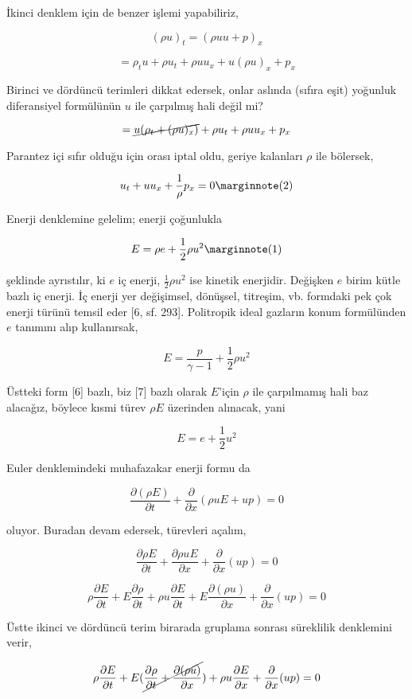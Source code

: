 \documentclass[12pt,fleqn]{article}\usepackage{../../common}
\begin{document}
İkinci denklem için de benzer işlemi yapabiliriz,

$$
(\rho u)_t = (\rho uu + p)_x
$$

$$
= \rho_t u + \rho u_t + \rho u u_x + u (\rho u)_x + p_x
$$

Birinci ve dördüncü terimleri dikkat edersek, onlar aslında (sıfıra eşit)
yoğunluk diferansiyel formülünün $u$ ile çarpılmış hali değil mi?

$$
= \cancel{u (\rho_t + (\rho u)_x )} + \rho u_t + \rho u u_x + p_x
$$

Parantez içi sıfır olduğu için orası iptal oldu, geriye kalanları $\rho$
ile bölersek,

$$
u_t + u u_x + \frac{1}{\rho} p_x = 0
\mlabel{2}
$$

Enerji
denklemine gelelim; enerji çoğunlukla

$$
E = \rho e + \frac{1}{2} \rho u^2
\mlabel{1}
$$

şeklinde ayrıstılır, ki $e$ iç enerji, $\frac{1}{2}\rho u^2$ ise kinetik
enerjidir. Değişken $e$ birim kütle bazlı iç enerji. İç enerji yer değişimsel,
dönüşsel, titreşim, vb. formdaki pek çok enerji türünü temsil eder [6, sf. 293].
Politropik ideal gazların konum formülünden $e$ tanımını alıp kullanırsak,

$$
E = \frac{p}{\gamma - 1} + \frac{1}{2} \rho u^2
$$

Üstteki form [6] bazlı, biz [7] bazlı olarak $E$'için $\rho$ ile çarpılmamış
hali baz alacağız, böylece kısmi türev $\rho E$ üzerinden alınacak, yani

$$
E = e + \frac{1}{2} u^2
$$

Euler denklemindeki muhafazakar enerji formu da

$$
\frac{\partial (\rho E)}{\partial t} + \frac{\partial }{\partial x} (\rho u E + up) = 0
$$

oluyor. Buradan devam edersek, türevleri açalım,

$$
\frac{\partial \rho E}{\partial t} + \frac{\partial \rho u E}{\partial x} +
\frac{\partial }{\partial x} (up) = 0
$$

$$
\rho \frac{\partial E}{\partial t} + E \frac{\partial \rho}{\partial t} +
\rho u \frac{\partial E}{\partial t} + E \frac{\partial (\rho u)}{\partial x} +
\frac{\partial }{\partial x} (up) = 0
$$

Üstte ikinci ve dördüncü terim birarada gruplama sonrası süreklilik denklemini
verir,

$$
\rho \frac{\partial E}{\partial t} +
E ( \cancel{\frac{\partial \rho}{\partial t} + \frac{\partial (\rho u)}{\partial x}}) +
\rho u \frac{\partial E}{\partial x} +
\frac{\partial }{\partial x} (up) = 0
$$
\end{document}
